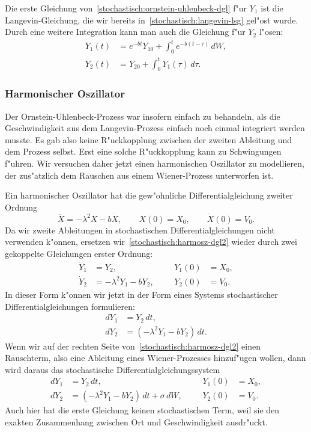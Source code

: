 Die erste Gleichung von~\eqref{stochastisch:ornstein-uhlenbeck-dgl}
f"ur $Y_1$ ist die Langevin-Gleichung, die wir bereits
in~\eqref{stochastisch:langevin-lsg} gel"ost wurde.
Durch eine weitere Integration kann man auch die Gleichung f"ur $Y_2$
l"osen:
\begin{align*}
Y_1(t)&=e^{-bt}Y_{10}+\int_0^te^{-b(t-\tau)}\,dW,\\
Y_2(t)&=Y_{20}+\int_0^t Y_1(\tau)\,d\tau.
\end{align*}

\subsubsection{Harmonischer Oszillator}
%
Der Ornstein-Uhlenbeck-Prozess war insofern einfach zu behandeln, als 
die Geschwindigkeit aus dem Langevin-Prozess einfach noch einmal
integriert werden musste.
Es gab also keine R"uckkopplung zwischen der zweiten Ableitung und
dem Prozess selbst.
Erst eine solche R"uckkopplung kann zu Schwingungen f"uhren.
Wir versuchen daher jetzt einen harmonischen Oszillator zu modellieren,
der zus"atzlich dem Rauschen aus einem Wiener-Prozess unterworfen ist.

Ein harmonischer Oszillator hat die gew"ohnliche Differentialgleichung
zweiter Ordnung
\begin{equation}
\ddot X=-\lambda^2 X-b\dot X,
\qquad
X(0)=X_0,
\qquad
\dot X(0)=V_0.
\label{stochastisch:harmosz-dgl2}
\end{equation}
Da wir zweite Ableitungen in stochastischen Differentialgleichungen
nicht verwenden k"onnen, ersetzen wir~\eqref{stochastisch:harmosz-dgl2}
wieder durch zwei gekoppelte Gleichungen erster Ordnung:
\begin{equation}
\begin{aligned}
\dot Y_1&=Y_2,                &&&Y_1(0)&=X_0, \\
\dot Y_2&=-\lambda^2 Y_1-bY_2,&&&Y_2(0)&=V_0.
\end{aligned}
\label{stochastisch:harmosz-dgl1}
\end{equation}
In dieser Form k"onnen wir jetzt in der Form eines Systems stochastischer
Differentialgleichungen formulieren:
\begin{align*}
dY_1&=Y_2\,dt,\\
dY_2&=(-\lambda^2Y_1-bY_2)\,dt.
\end{align*}
Wenn wir auf der rechten Seite von~\eqref{stochastisch:harmosz-dgl2}
einen Rauschterm, also eine Ableitung eines Wiener-Prozesses hinzuf"ugen
wollen, dann wird daraus das stochastische Differentialgleichungssystem
\begin{equation}
\begin{aligned}
dY_1&=Y_2\,dt,                                &&&Y_1(0)&=X_0,\\
dY_2&=(-\lambda^2 Y_1-bY_2)\,dt + \sigma\,dW, &&&Y_2(0)&=V_0.
\end{aligned}
\end{equation}
Auch hier hat die erste Gleichung keinen stochastischen Term, weil sie
den exakten Zusammenhang zwischen Ort und Geschwindigkeit ausdr"uckt.

